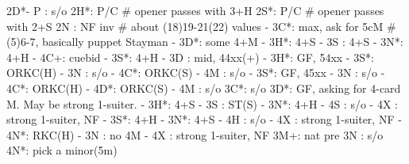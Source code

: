 2D*-
P  : s/o
2H*: P/C  # opener passes with 3+H
2S*: P/C  # opener passes with 2+S
2N : NF inv  # about (18)19-21(22) values
   - 3C*: max, ask for 5cM  # (5)6-7, basically puppet Stayman
        - 3D*: some 4+M
             - 3H*: 4+S
                  - 3S : 4+S
                  - 3N*: 4+H
                  - 4C+: cuebid
             - 3S*: 4+H
   - 3D : mid, 44xx(+)
   - 3H*: GF, 54xx
        - 3S*: ORKC(H)
        - 3N : s/o
        - 4C*: ORKC(S)
        - 4M : s/o
   - 3S*: GF, 45xx
        - 3N : s/o
        - 4C*: ORKC(H)
        - 4D*: ORKC(S)
        - 4M : s/o
3C*: s/o
3D*: GF, asking for 4-card M. May be strong 1-suiter.
   - 3H*: 4+S
        - 3S : ST(S)
        - 3N*: 4+H
        - 4S : s/o
        - 4X : strong 1-suiter, NF
   - 3S*: 4+H
        - 3N*: 4+S
        - 4H : s/o
        - 4X : strong 1-suiter, NF
        - 4N*: RKC(H)
   - 3N : no 4M
        - 4X : strong 1-suiter, NF
3M+: nat pre
3N : s/o
4N*: pick a minor(5m)

